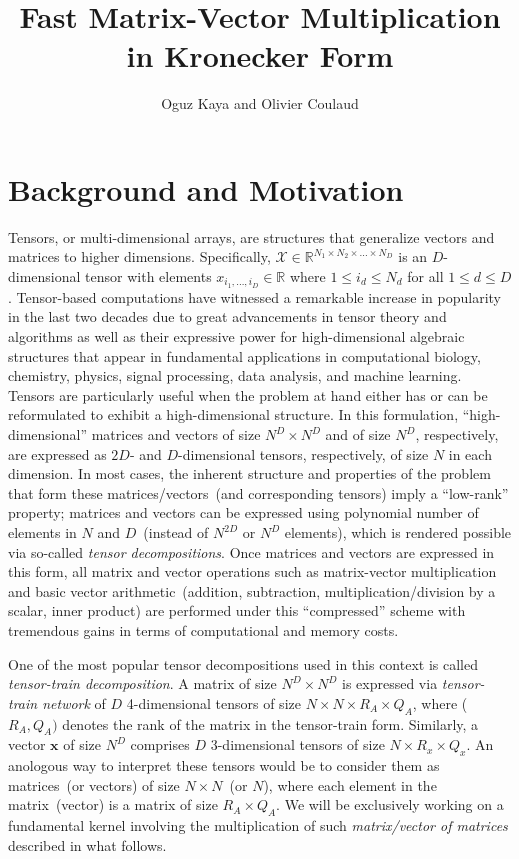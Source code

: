 \documentclass{article}
\title{Fast Matrix-Vector Multiplication in Kronecker Form}
\author{Oguz Kaya and Olivier Coulaud}
\date{}
\newcommand{\ten}[1]{\boldsymbol{\mathcal{#1}}}
\renewcommand{\vec}[1]{\mathbf{#1}}
\newcommand{\R}{\mathbb{R}}
\begin{document}
\maketitle

\section{Background and Motivation}

Tensors, or multi-dimensional arrays, are structures that generalize vectors and matrices to higher dimensions.
Specifically, $\ten{X} \in \R^{N_1 \times N_2 \times \dots \times N_D}$ is an $D$-dimensional tensor with elements $x_{i_1, \dots, i_D} \in \R$ where $1 \le i_d \le N_d$ for all $1 \le d \le D$.
Tensor-based computations have witnessed a remarkable increase in popularity in the last two decades due to great advancements in tensor theory and algorithms as well as their expressive power for high-dimensional algebraic structures that appear in fundamental applications in computational biology, chemistry, physics, signal processing, data analysis, and machine learning.
Tensors are particularly useful when the problem at hand either has or can be reformulated to exhibit a high-dimensional structure.
In this formulation, ``high-dimensional'' matrices and vectors of size $N^D \times N^D$ and of size $N^D$, respectively, are expressed as $2D$- and $D$-dimensional tensors, respectively, of size $N$ in each dimension.
In most cases, the inherent structure and properties of the problem that form these matrices/vectors~(and corresponding tensors) imply a ``low-rank'' property; matrices and vectors can be expressed using polynomial number of elements in $N$ and $D$~(instead of $N^{2D}$ or $N^D$ elements), which is rendered possible via so-called \emph{tensor decompositions}.
Once matrices and vectors are expressed in this form, all matrix and vector operations such as matrix-vector multiplication and basic vector arithmetic~(addition, subtraction, multiplication/division by a scalar, inner product) are performed under this ``compressed'' scheme with tremendous gains in terms of computational and memory costs.

One of the most popular tensor decompositions used in this context is called \textit{tensor-train decomposition}.
A matrix of size $N^D \times N^D$ is expressed via \textit{tensor-train network} of $D$ 4-dimensional tensors of size $N \times N \times R_A \times Q_A$, where ($R_A, Q_A)$ denotes the rank of the matrix in the tensor-train form.
Similarly, a vector $\vec{x}$ of size $N^D$ comprises $D$ 3-dimensional tensors of size $N \times R_x \times Q_x$.
An anologous way to interpret these tensors would be to consider them as matrices~(or vectors) of size $N \times N$~(or $N$), where each element in the matrix~(vector) is a matrix of size $R_A \times Q_A$.
We will be exclusively working on a fundamental kernel involving the multiplication of such \textit{matrix/vector of matrices} described in what follows.
\end{document}
